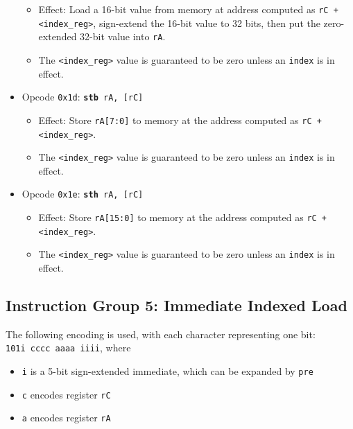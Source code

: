 \documentclass{article}
\begin{document}
\begin{itemize}
		\begin{itemize}
			\item Effect:  Load a 16-bit value from memory at address
			computed as \texttt{rC + <index\_reg>}, sign-extend
			the 16-bit value to 32 bits, then put the zero-extended 32-bit
			value into \texttt{rA}.
			\item The \texttt{<index\_reg>} value is guaranteed to be zero
			unless an \texttt{index} is in effect.
		\end{itemize}
		\item Opcode \texttt{0x1d}:
			\texttt{\textbf{stb} rA, [rC]}
		\begin{itemize}
			\item Effect:  Store \texttt{rA[7:0]} to memory at the address
			computed as \texttt{rC + <index\_reg>}.
			\item The \texttt{<index\_reg>} value is guaranteed to be zero
			unless an \texttt{index} is in effect.
		\end{itemize}
		\item Opcode \texttt{0x1e}:
			\texttt{\textbf{sth} rA, [rC]}
		\begin{itemize}
			\item Effect:  Store \texttt{rA[15:0]} to memory at the address
			computed as \texttt{rC + <index\_reg>}.
			\item The \texttt{<index\_reg>} value is guaranteed to be zero
			unless an \texttt{index} is in effect.
		\end{itemize}

	\end{itemize}

	\doublespacing
	\subsection{Instruction Group 5:  Immediate Indexed Load}
	The following encoding is used, with each character representing one
	bit:  \\
	\texttt{101i cccc aaaa iiii}, where

	\singlespacing
	\begin{itemize}
		\item \texttt{i} is a 5-bit sign-extended immediate, which can
		be expanded by \texttt{pre}  
		\item \texttt{c} encodes register \texttt{rC}
		\item \texttt{a} encodes register \texttt{rA}
	\end{itemize}
	\doublespacing
\end{document}
